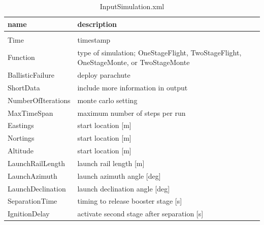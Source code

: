 \documentclass[11pt, a4paper]{article}
\begin{document}
\begin{table}
  \centering
  \caption{InputSimulation.xml}
  \label{tab:input_simulation_xml}
  \begin{tabular}{l p{8cm}}
    \textbf{name} & \textbf{description} \\
    \hline \\
    Time & timestamp \\
    Function & type of simulation; OneStageFlight, TwoStageFlight,  OneStageMonte, or TwoStageMonte \\
    BallisticFailure & deploy parachute \\
    ShortData & include more information in output \\
    NumberOfIterations & monte carlo setting \\
    MaxTimeSpan & maximum number of steps per run \\
    Eastings & start location [m] \\
    Nortings & start location [m] \\
    Altitude & start location [m] \\
    LaunchRailLength & launch rail length [m] \\
    LaunchAzimuth & launch azimuth angle [deg] \\
    LaunchDeclination & launch declination angle [deg] \\
    SeparationTime & timing to release booster stage [s] \\
    IgnitionDelay & activate second stage after separation [s] \\
  \end{tabular}
\end{table}
\end{document}
